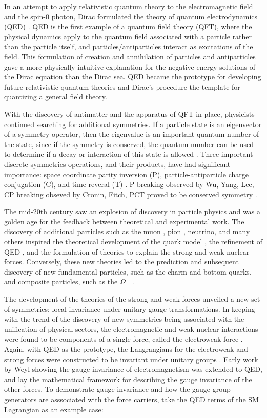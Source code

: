 \indent In an attempt to apply relativistic quantum theory to the electromagnetic field and the spin-0 photon, Dirac formulated the theory of quantum electrodynamics (QED) \cite{Dirac243}. QED is the first example of a quantum field theory (QFT), where the physical dynamics apply to the quantum field associated with a particle rather than the particle itself, and particles/antiparticles interact as excitations of the field. This formulation of creation and annihilation of particles and antiparticles gave a more physically intuitive explanation for the negative energy solutions of the Dirac equation than the Dirac sea. QED became the prototype for developing future relativistic quantum theories and Dirac's procedure the template for quantizing a general field theory. 

\indent With the discovery of antimatter and the apparatus of QFT in place, physicists continued searching for additional symmetries. If a particle state is an eigenvector of a symmetry operator, then the eigenvalue is an important quantum number of the state, since if the symmetry is conserved, the quantum number can be used to determine if a decay or interaction of this state is allowed \cite{}. Three important discrete symmetries operations, and their products, have had significant importance: space coordinate parity inversion (P), particle-antiparticle charge conjugation (C), and time reveral (T) \cite{Bettini}. P breaking observed by Wu, Yang, Lee, CP breaking obseved by Cronin, Fitch, PCT proved to be conserved symmetry \cite{}.

\indent The mid-20th century saw an explosion of discovery in particle physics and was a golden age for the feedback between theoretical and experimental work. The discovery of additional particles such as the muon \cite{}, pion \cite{}, neutrino\cite{}, and many others inspired the theoretical development of the quark model \cite{}, the refinement of QED \cite{}, and the formulation of theories to explain the strong \cite{} and weak \cite{} nuclear forces. Conversely, these new theories led to the prediction and subsequent discovery of new fundamental particles, such as the charm \cite{} and bottom \cite{} quarks, and composite particles, such as the $\Omega^-$ \cite{}.

\indent The development of the theories of the strong and weak forces unveiled a new set of symmetries: local invariance under unitary gauge transformations. In keeping with the trend of the discovery of new symmetries being associated with the unification of physical sectors, the electromagnetic and weak nuclear interactions were found to be components of a single force, called the electroweak force \cite{}. Again, with QED as the prototype, the Langrangians for the electroweak and strong forces were constructed to be invariant under unitary groups \cite{}. Early work by Weyl \cite{} showing the gauge invariance of electromagnetism was extended to QED, and lay the mathematical framework for describing the gauge invariance of the other forces. To demonstrate gauge invariance and how the gauge group generators are asssociated with the force carriers, take the QED terms of the SM Lagrangian as an example case:


